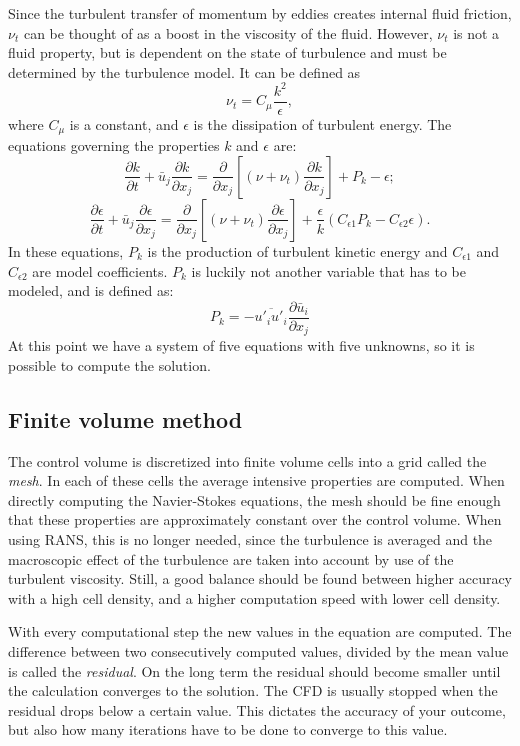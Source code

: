 Since the turbulent transfer of momentum by eddies creates internal fluid friction, $\nu_t$ can be thought of as a boost in the viscosity of the fluid. However, $\nu_t$ is not a fluid property, but is dependent on the state of turbulence and must be determined by the turbulence model. It can be defined as 
\begin{equation}\label{eq:NU}
\nu_t = C_\mu\frac{k^2}{\epsilon},
\end{equation}
where $C_\mu$ is a constant, and $\epsilon$ is the dissipation of turbulent energy. The equations governing the properties $k$ and $\epsilon$ are:
\begin{equation}\label{eq:ke1}
\frac{\partial k}{\partial t} + \bar{u}_j\frac{\partial k}{\partial x_j} = \frac{\partial}{\partial x_j} \left[(\nu + \nu_t) \frac{\partial k }{\partial x_j}\right] + P_k - \epsilon;
\end{equation}
\begin{equation}\label{eq:ke2}
\frac{\partial \epsilon}{\partial t} + \bar{u}_j\frac{\partial \epsilon}{\partial x_j} = \frac{\partial}{\partial x_j} \left[(\nu + \nu_t) \frac{\partial \epsilon}{\partial x_j}\right] + \frac{\epsilon}{k}(C_{\epsilon 1}P_k - C_{\epsilon 2}\epsilon).
\end{equation}
In these equations, $P_k$ is the production of turbulent kinetic energy and $C_{\epsilon 1}$ and $C_{\epsilon 2}$ are model coefficients. $P_k$ is luckily not another variable that has to be modeled, and is defined as:
\begin{equation}\label{eq:P}
P_k=-\overline{u'_iu'_i}\frac{\partial \bar{u}_i}{\partial x_j}
\end{equation}
At this point we have a system of five equations with five unknowns, so it is possible to compute the solution.

\subsection{Finite volume method}

The control volume is discretized into finite volume cells into a grid called the \emph{mesh}. In each of these cells the average intensive properties are computed. When directly computing the Navier-Stokes equations, the mesh should be fine enough that these properties are approximately constant over the control volume. When using RANS, this is no longer needed, since the turbulence is averaged and the macroscopic effect of the turbulence are taken into account by use of the turbulent viscosity. Still, a good balance should be found between higher accuracy with a high cell density, and a higher computation speed with lower cell density. 

With every computational step the new values in the equation are computed. The difference between two consecutively computed values, divided by the mean value is called the \emph{residual}. On the long term the residual should become smaller until the calculation converges to the solution. The CFD is usually stopped when the residual drops below a certain value. This dictates the accuracy of your outcome, but also how many iterations have to be done to converge to this value.